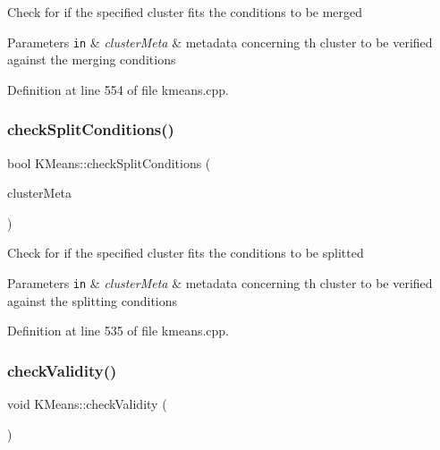Check for if the specified cluster fits the conditions to be merged


\begin{DoxyParams}[1]{Parameters}
\mbox{\tt in}  & {\em cluster\+Meta} & metadata concerning th cluster to be verified against the merging conditions \\
\hline
\end{DoxyParams}


Definition at line 554 of file kmeans.\+cpp.

\mbox{\label{class_k_means_ac934340bd9baf49360e5cf951f7f6ccb}} 
\subsubsection{\texorpdfstring{check\+Split\+Conditions()}{checkSplitConditions()}}
{\footnotesize\ttfamily bool K\+Means\+::check\+Split\+Conditions (\begin{DoxyParamCaption}\item[{\hyperlink{class_wss_bag}{Wss\+Bag} \&}]{cluster\+Meta }\end{DoxyParamCaption})}

Check for if the specified cluster fits the conditions to be splitted


\begin{DoxyParams}[1]{Parameters}
\mbox{\tt in}  & {\em cluster\+Meta} & metadata concerning th cluster to be verified against the splitting conditions \\
\hline
\end{DoxyParams}


Definition at line 535 of file kmeans.\+cpp.

\mbox{\label{class_k_means_a957725688440a070083e9fcb0f017ce9}} 
\subsubsection{\texorpdfstring{check\+Validity()}{checkValidity()}}
{\footnotesize\ttfamily void K\+Means\+::check\+Validity (\begin{DoxyParamCaption}{ }\end{DoxyParamCaption})}



